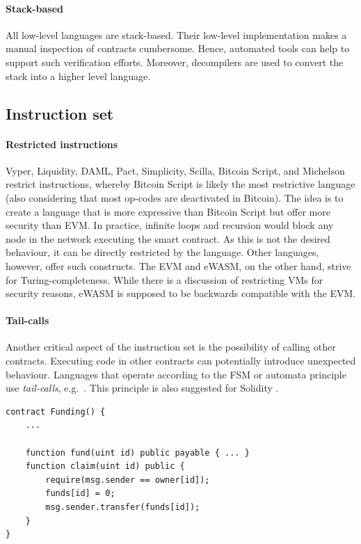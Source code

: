 \paragraph{Stack-based}
All low-level languages are stack-based. Their low-level implementation makes a manual inspection of contracts cumbersome. Hence, automated tools can help to support such verification efforts. Moreover, decompilers are used to convert the stack into a higher level language.

\subsection{Instruction set}
\paragraph{Restricted instructions}
Vyper, Liquidity, DAML, Pact, Simplicity, Scilla, Bitcoin Script, and Michelson restrict instructions, whereby Bitcoin Script is likely the most restrictive language (also considering that most op-codes are deactivated in Bitcoin). 
The idea is to create a language that is more expressive than Bitcoin Script but offer more security than EVM.
In practice, infinite loops and recursion would block any node in the network executing the smart contract. As this is not the desired behaviour, it can be directly restricted by the language. Other languages, however, offer such constructs.
The EVM and eWASM, on the other hand, strive for Turing-completeness. While there is a discussion of restricting VMs for security reasons, eWASM is supposed to be backwards compatible with the EVM.

\paragraph{Tail-calls}
Another critical aspect of the instruction set is the possibility of calling other contracts. Executing code in other contracts can potentially introduce unexpected behaviour. Languages that operate according to the FSM or automata principle use \emph{tail-calls}, e.g.\ \cite{Sergey2018}. This principle is also suggested for Solidity \cite{ConsenSys2018Security}.

\begin{lstlisting}[caption={Tail calls implemented in Solidity.},label=lst:tail-call,language=Solidity]
contract Funding() { 
	...
	
	function fund(uint id) public payable { ... }
	function claim(uint id) public {
		require(msg.sender == owner[id]);
		funds[id] = 0;
		msg.sender.transfer(funds[id]);
	}
}
\end{lstlisting}

